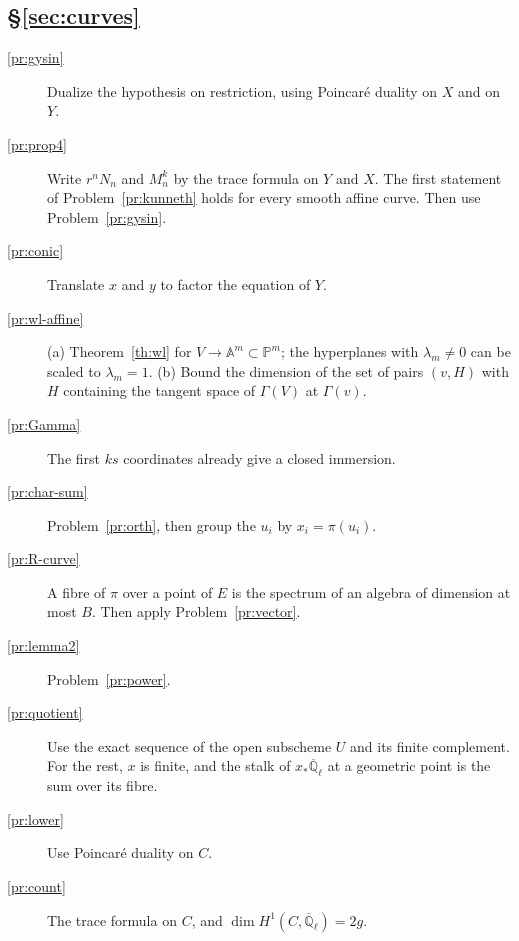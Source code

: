 \documentclass[reqno]{amsart}
\theoremstyle{definition}
\theoremstyle{plain}
\newcommand{\Q}{\mathbb{Q}}
\newcommand{\A}{\mathbb{A}}
\newcommand{\Ql}{\overline{\Q}_\ell}
\begin{document}
\subsection*{\S\ref{sec:curves}}
\begin{description}
\item[\ref{pr:gysin}] Dualize the hypothesis on restriction, using Poincar\'e duality on \(X\) and on \(Y\).
\item[\ref{pr:prop4}] Write \(r^nN_n\) and \(M_n^k\) by the trace formula on \(Y\) and \(X\).  The first statement of Problem~\ref{pr:kunneth} holds for every smooth affine curve.  Then use Problem~\ref{pr:gysin}.
\item[\ref{pr:conic}] Translate \(x\) and \(y\) to factor the equation of \(Y\).
\item[\ref{pr:wl-affine}] (a) Theorem~\ref{th:wl} for \(V \to \A^m \subset \mathbb{P}^m\); the hyperplanes with \(\lambda_m \ne 0\) can be scaled to \(\lambda_m = 1\).  (b) Bound the dimension of the set of pairs \((v, H)\) with \(H\) containing the tangent space of \(\Gamma(V)\) at \(\Gamma(v)\).
\item[\ref{pr:Gamma}] The first \(ks\) coordinates already give a closed immersion.
\item[\ref{pr:char-sum}] Problem~\ref{pr:orth}, then group the \(u_i\) by \(x_i = \pi(u_i)\).
\item[\ref{pr:R-curve}] A fibre of \(\pi\) over a point of \(E\) is the spectrum of an algebra of dimension at most \(B\).  Then apply Problem~\ref{pr:vector}.
\item[\ref{pr:lemma2}] Problem~\ref{pr:power}.
\item[\ref{pr:quotient}] Use the exact sequence of the open subscheme \(U\) and its finite complement.  For the rest, \(x\) is finite, and the stalk of \(x_*\Ql\) at a geometric point is the sum over its fibre.
\item[\ref{pr:lower}] Use Poincar\'e duality on \(C\).
\item[\ref{pr:count}] The trace formula on \(C\), and \(\dim H^1(C, \Ql) = 2g\).
\end{description}
\end{document}
